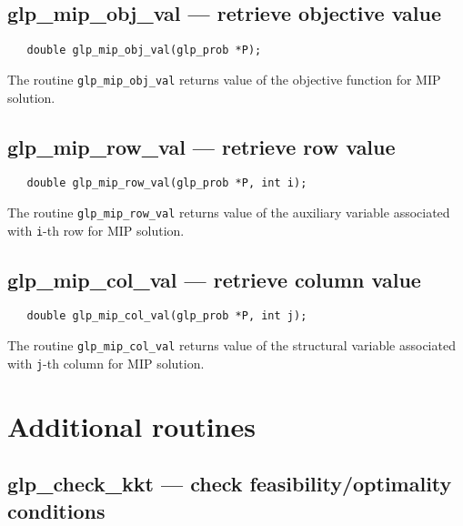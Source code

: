 \subsection{glp\_mip\_obj\_val --- retrieve objective value}

\synopsis

\begin{verbatim}
   double glp_mip_obj_val(glp_prob *P);
\end{verbatim}

\returns

The routine \verb|glp_mip_obj_val| returns value of the objective
function for MIP solution.

\subsection{glp\_mip\_row\_val --- retrieve row value}

\synopsis

\begin{verbatim}
   double glp_mip_row_val(glp_prob *P, int i);
\end{verbatim}

\returns

The routine \verb|glp_mip_row_val| returns value of the auxiliary
variable associated with \verb|i|-th row for MIP solution.

\subsection{glp\_mip\_col\_val --- retrieve column value}

\synopsis

\begin{verbatim}
   double glp_mip_col_val(glp_prob *P, int j);
\end{verbatim}

\returns

The routine \verb|glp_mip_col_val| returns value of the structural
variable associated with \verb|j|-th column for MIP solution.


\newpage

\section{Additional routines}

\subsection{glp\_check\_kkt --- check feasibility/optimality
conditions}

